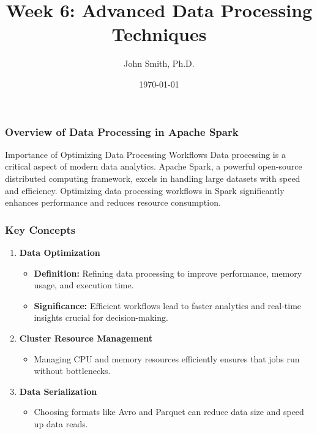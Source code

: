 \documentclass[aspectratio=169]{beamer}
\title[Week 6: Advanced Data Processing Techniques]{Week 6: Advanced Data Processing Techniques}
\author[J. Smith]{John Smith, Ph.D.}
\institute[University Name]{
  Department of Computer Science\\
  University Name\\
  Email: email@university.edu\\
  Website: www.university.edu
}
\date{\today}
\begin{document}
\frame{\titlepage}

\begin{frame}[fragile]
    \titlepage
\end{frame}

\begin{frame}[fragile]
    \frametitle{Overview of Data Processing in Apache Spark}
    
    \begin{block}{Importance of Optimizing Data Processing Workflows}
        Data processing is a critical aspect of modern data analytics. 
        Apache Spark, a powerful open-source distributed computing framework, excels 
        in handling large datasets with speed and efficiency. Optimizing data 
        processing workflows in Spark significantly enhances performance and reduces 
        resource consumption.
    \end{block}
\end{frame}

\begin{frame}[fragile]
    \frametitle{Key Concepts}
    
    \begin{enumerate}
        \item \textbf{Data Optimization}
            \begin{itemize}
                \item \textbf{Definition:} Refining data processing to improve performance, memory usage, and execution time.
                \item \textbf{Significance:} Efficient workflows lead to faster analytics and real-time insights crucial for decision-making.
            \end{itemize}
        
        \item \textbf{Cluster Resource Management}
            \begin{itemize}
                \item Managing CPU and memory resources efficiently ensures that jobs run without bottlenecks.
            \end{itemize}
        
        \item \textbf{Data Serialization}
            \begin{itemize}
                \item Choosing formats like Avro and Parquet can reduce data size and speed up data reads.
            \end{itemize}
    \end{enumerate}
\end{frame}
\end{document}
